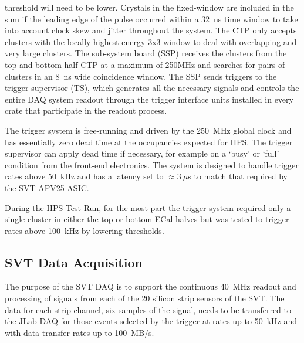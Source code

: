 \documentclass[final,3p,times,twocolumn]{elsarticle}
\begin{document}
threshold will need to be lower.  Crystals in the 
fixed-window are included in the sum if the leading edge of the pulse occurred within a 32~ns time 
window to take into account clock skew and jitter throughout the system.
The CTP only accepts clusters with the locally highest energy 3x3 window to deal with overlapping and 
very large clusters. The sub-system board (SSP) receives the clusters from the top and bottom half CTP 
at a maximum of 250MHz and searches for pairs of clusters in an 8~ns wide coincidence window. The 
SSP sends triggers to the trigger supervisor (TS), which generates all the necessary signals and 
controls the entire DAQ system readout through the trigger interface units installed in every crate that 
participate in the readout process.

The trigger system is free-running and driven by the 250~MHz global clock and has essentially zero 
dead time at the occupancies expected for HPS. The trigger supervisor can apply dead time if 
necessary, for example on a `busy' or `full' condition from the front-end electronics. The system is 
designed to handle trigger rates above 50~kHz and has a latency set to $\approx 3~\mu$s to match 
that required by the SVT APV25 ASIC. 

During the HPS Test Run, for the most part the trigger system 
required only a single cluster in either the top or bottom ECal halves but was tested to trigger rates 
above 100~kHz by lowering thresholds.  



\subsection{SVT Data Acquisition}
\label{sec:svt_daq}
The purpose of the SVT DAQ is to support the continuous 40~MHz readout and processing of signals from 
each of the 20 silicon strip sensors of the SVT. The data for each strip channel, six samples of the 
signal, needs to be transferred to the JLab DAQ for those events selected by the trigger at rates 
up to 50~kHz and with data transfer rates up to 100~MB/s.
\end{document}
